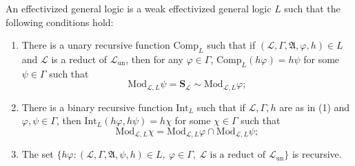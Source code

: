 An effectivized general logic is a weak effectivized general logic $L$ such that the following conditions hold:

\begin{enumerate}
  \item[(1)] There is a unary recursive function $\mathrm{Comp}_L$ such that if $(\mathcal{L}, \Gamma, \mathfrak{A}, \varphi, h) \in L$ and $\mathcal{L}$ is a reduct of $\mathcal{L}_{\mathrm{un}}$, then for any $\varphi \in \Gamma$, $\mathrm{Comp}_L(h\varphi) = h\psi$ for some $\psi \in \Gamma$ such that
  $$\mathrm{Mod}_{\mathcal{L}, L} \psi = \mathbf{S}_{\mathcal{L}} \sim \mathrm{Mod}_{\mathcal{L}, L} \varphi;$$

  \item[(2)] There is a binary recursive function $\mathrm{Int}_L$ such that if $\mathcal{L}, \Gamma, h$ are as in (1) and $\varphi, \psi \in \Gamma$, then $\mathrm{Int}_L(h\varphi, h\psi) = h\chi$ for some $\chi \in \Gamma$ such that
  $$\mathrm{Mod}_{\mathcal{L}, L} \chi = \mathrm{Mod}_{\mathcal{L}, L} \varphi \cap \mathrm{Mod}_{\mathcal{L}, L} \psi;$$

  \item[(3)] The set $\{h\varphi : (\mathcal{L}, \Gamma, \mathfrak{A}, \psi, h) \in L,\ \varphi \in \Gamma,\ \mathcal{L} \text{ is a reduct of } \mathcal{L}_{\mathrm{un}}\}$ is recursive.
\end{enumerate}
